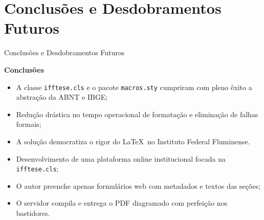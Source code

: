 \documentclass[aspectratio=169, 10pt]{beamer}
\begin{document}
\section{Conclusões e Desdobramentos Futuros}

\begin{frame}{Conclusões e Desdobramentos Futuros}
  \begin{block}{\textbf{Conclusões}}
    \scriptsize
    \begin{itemize}\setlength{\itemsep}{1.5pt}
      \item A classe \texttt{ifftese.cls} e o pacote \texttt{macros.sty} cumpriram com pleno êxito a abstração da ABNT e IBGE;
      \item Redução drástica no tempo operacional de formatação e eliminação de falhas formais;
      \item A solução democratiza o rigor do \LaTeX\ no Instituto Federal Fluminense.
    \end{itemize}
  \end{block}

  \vspace{0.08cm}

  \begin{tcolorbox}[colback=conepeteal!10,colframe=conepeteal,arc=1.5mm,title=\textbf{Trabalho em Andamento: Interface Web por Formulários}]
    \scriptsize
    \begin{itemize}\setlength{\itemsep}{1.5pt}
      \item Desenvolvimento de uma plataforma online institucional focada na \texttt{ifftese.cls};
      \item O autor preenche apenas formulários web com metadados e textos das seções;
      \item O servidor compila e entrega o PDF diagramado com perfeição nos bastidores.
    \end{itemize}
  \end{tcolorbox}
\end{frame}

\end{document}
